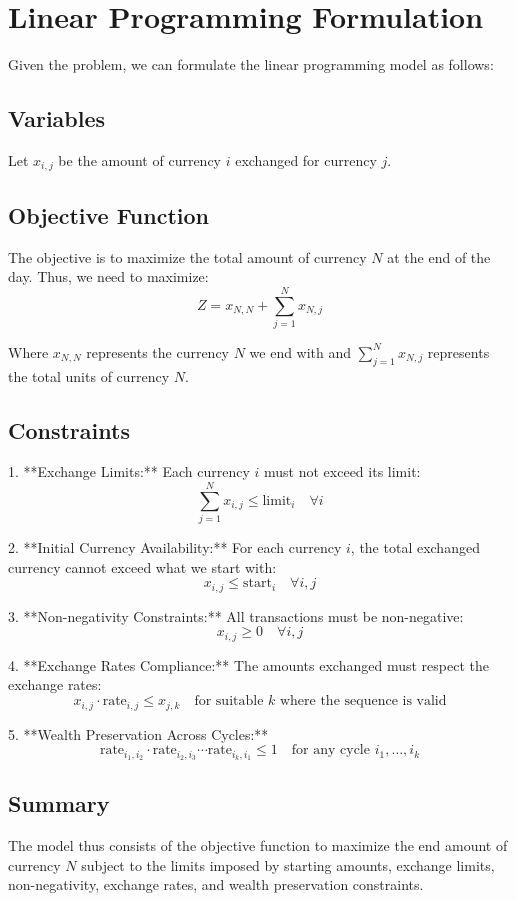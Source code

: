 \documentclass{article}
\begin{document}
\section*{Linear Programming Formulation}

Given the problem, we can formulate the linear programming model as follows:

\subsection*{Variables}
Let \( x_{i,j} \) be the amount of currency \( i \) exchanged for currency \( j \). 

\subsection*{Objective Function}
The objective is to maximize the total amount of currency \( N \) at the end of the day. Thus, we need to maximize:
\[
Z = x_{N, N} + \sum_{j=1}^{N} x_{N,j}
\]

Where \( x_{N,N} \) represents the currency \( N \) we end with and \(\sum_{j=1}^{N} x_{N,j}\) represents the total units of currency \( N \).

\subsection*{Constraints}
1. **Exchange Limits:** Each currency \( i \) must not exceed its limit:
\[
\sum_{j=1}^{N} x_{i,j} \leq \text{limit}_i \quad \forall i
\]

2. **Initial Currency Availability:** For each currency \( i \), the total exchanged currency cannot exceed what we start with:
\[
x_{i,j} \leq \text{start}_i \quad \forall i,j
\]

3. **Non-negativity Constraints:** All transactions must be non-negative:
\[
x_{i,j} \geq 0 \quad \forall i,j
\]

4. **Exchange Rates Compliance:** The amounts exchanged must respect the exchange rates:
\[
x_{i,j} \cdot \text{rate}_{i,j} \leq x_{j,k} \quad \text{for suitable } k \text{ where the sequence is valid}
\]

5. **Wealth Preservation Across Cycles:** 
\[
\text{rate}_{i_1,i_2} \cdot \text{rate}_{i_2,i_3} \cdots \text{rate}_{i_k,i_1} \leq 1 \quad \text{for any cycle } i_1, \ldots, i_k
\]

\subsection*{Summary}
The model thus consists of the objective function to maximize the end amount of currency \( N \) subject to the limits imposed by starting amounts, exchange limits, non-negativity, exchange rates, and wealth preservation constraints.
\end{document}
